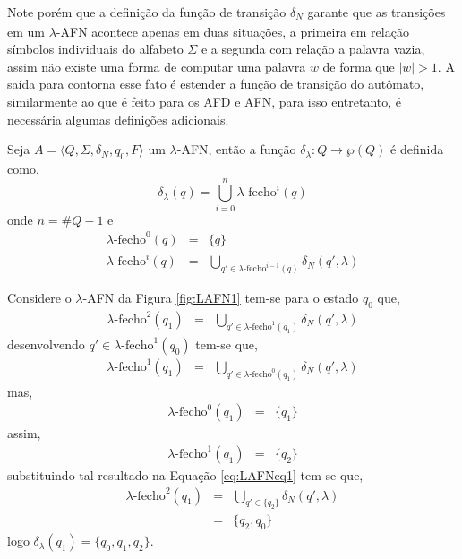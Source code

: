 Note porém que a definição da função de transição $\underline{\delta_N}$ garante que as transições em um $\lambda$-AFN acontece apenas em duas situações, a primeira em relação símbolos individuais do alfabeto $\Sigma$ e a segunda com relação a palavra vazia, assim não existe uma forma de computar uma palavra $w$ de forma que $|w| > 1$. A saída para contorna esse fato é estender a função de transição do autômato, similarmente ao que é feito para os AFD e AFN, para isso entretanto, é necessária algumas definições adicionais.

\begin{definition}\label{def:L-fecho}
	Seja $A = \langle Q, \Sigma, \underline{\delta_N}, q_0, F\rangle$ um $\lambda$-AFN, então a função $\delta_\lambda: Q \rightarrow \wp(Q)$ é definida como,
	\begin{equation}
		\delta_\lambda(q) = \bigcup_{i = 0}^n\lambda\text{-fecho}^i(q)
	\end{equation}
	onde $n = \# Q - 1$ e
	\begin{eqnarray}
		\lambda\text{-fecho}^0(q) & = & \{q\}\\
		\lambda\text{-fecho}^{i}(q) & = & \bigcup_{q' \in \lambda\text{-fecho}^{i-1}(q)} \delta_N(q', \lambda)
	\end{eqnarray}
\end{definition}

\begin{exem}
	Considere o $\lambda$-AFN da Figura \ref{fig:LAFN1} tem-se para o estado $q_0$ que,
	\begin{eqnarray}\label{eq:LAFNeq1}
		\lambda\text{-fecho}^{2}(q_1) & = &  \bigcup_{q' \in \lambda\text{-fecho}^{1}(q_1)} \delta_N(q', \lambda)
	\end{eqnarray}
	desenvolvendo $q' \in \lambda\text{-fecho}^{1}(q_0)$ tem-se que,
	\begin{eqnarray*}
		\lambda\text{-fecho}^{1}(q_1) & = &  \bigcup_{q' \in \lambda\text{-fecho}^{0}(q_1)} \delta_N(q', \lambda)
	\end{eqnarray*}
	mas, 
	\begin{eqnarray*}
		\lambda\text{-fecho}^{0}(q_1) & = & \{q_1\}
	\end{eqnarray*}
	assim, 
	\begin{eqnarray*}
		\lambda\text{-fecho}^{1}(q_1) & = &  \{q_2\}
	\end{eqnarray*}
	substituindo tal resultado na Equação \ref{eq:LAFNeq1} tem-se que, 
	\begin{eqnarray*}\label{eq:LAFNeq2}
		\lambda\text{-fecho}^{2}(q_1) & = & \bigcup_{q' \in \{q_2\}} \delta_N(q', \lambda)\\
		& = & \{q_2, q_0\}
	\end{eqnarray*}
	logo $\delta_\lambda(q_1) = \{q_0, q_1, q_2\}$.
\end{exem}

